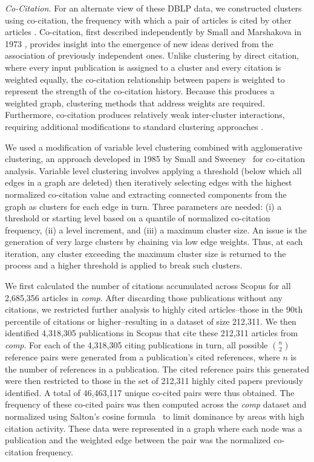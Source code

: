 \emph{Co-Citation.} For an alternate view of these DBLP data, we constructed clusters using co-citation, the frequency with which a pair of articles is cited by other articles \cite{small_co-citation_1973,marshakova-shaikevich_co-citation_1973}. Co-citation, first described independently by Small and Marshakova in 1973 \cite{marshakova-shaikevich_co-citation_1973}, provides insight into the emergence of new ideas derived from the association of previously independent ones. Unlike clustering by direct citation, where every input publication is assigned to a cluster and every citation is weighted equally, the co-citation relationship between papers is weighted to represent the strength of the co-citation history.
Because this produces a weighted graph, clustering methods that address weights are required.
Furthermore, co-citation produces relatively weak inter-cluster interactions, requiring additional modifications to standard clustering approaches \cite{boyack_cocitation_2010,boyack_improving_2013,small_structure_1974,small_clustering_1985}. 

We used a modification of variable level clustering combined with agglomerative clustering, an approach developed in 1985 by Small and Sweeney~\cite{small_clustering_1985} for co-citation analysis.
Variable level clustering involves applying a threshold (below which all edges in a graph are deleted) then iteratively selecting edges with the highest normalized co-citation value and extracting connected components from the graph as clusters for each edge in turn. Three parameters are needed: (i) a threshold or starting level based on a quantile of normalized co-citation frequency, (ii) a level increment, and (iii) a maximum cluster size. An issue is the generation of very large clusters by chaining via low edge weights.  Thus, at each iteration, any cluster exceeding the maximum cluster size  is returned to the process and a higher threshold is applied to break such clusters.


We first calculated the number of citations accumulated across Scopus for all 2,685,356 articles in \emph{comp}. After discarding those publications without any citations, we restricted further analysis to highly cited articles--those in the 90th percentile of citations or higher--resulting in a dataset of size 212,311. We then identified 4,318,305 publications in Scopus that cite these 212,311 articles from \emph{comp}. For each of the 4,318,305 citing publications in turn, all possible ${n \choose 2}$ reference pairs were generated from a publication's cited references, where $n$ is the number of references in a publication. The cited reference pairs this generated were then restricted to those in the set of 212,311 highly cited papers previously identified. A total of 46,463,117 unique co-cited pairs were thus obtained. 
The frequency of these co-cited pairs was then computed across the \emph{comp} dataset  and normalized using Salton's cosine formula~\cite{salton_citation_1979} to limit dominance by areas with high citation activity. These data were represented in a graph where each node was a publication and the weighted edge between the pair was the normalized co-citation frequency. \par 

